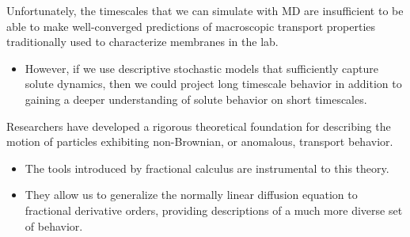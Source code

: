 \documentclass{article}
\begin{document}
  Unfortunately, the timescales that we can simulate with MD are insufficient to be
  able to make well-converged predictions of macroscopic transport properties 
  traditionally used to characterize membranes in the lab.
  \begin{itemize}
    \item However, if we use descriptive stochastic models that sufficiently capture solute
    dynamics, then we could project long timescale behavior in addition to gaining
    a deeper understanding of solute behavior on short timescales.
  \end{itemize}
  
  \noindent Researchers have developed a rigorous theoretical foundation for describing
  the motion of particles exhibiting non-Brownian, or anomalous, transport behavior.
  \begin{itemize}
    \item The tools introduced by fractional calculus are instrumental to this theory. 
    \item They allow us to generalize the normally linear diffusion equation to fractional
    derivative orders, providing descriptions of a much more diverse set of behavior. \cite{klages_anomalous_2008} %
  \end{itemize}
  
\end{document}
